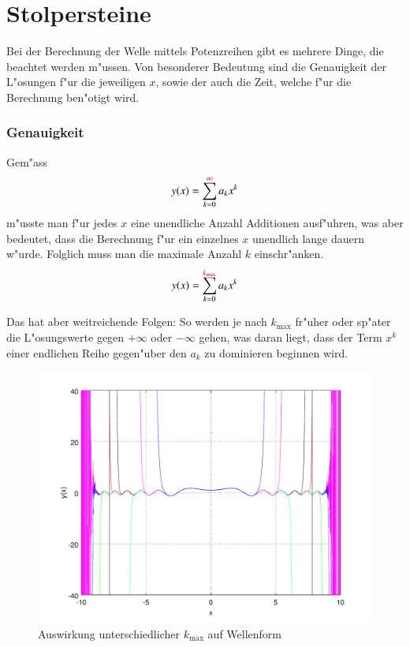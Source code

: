 \section{Stolpersteine}

Bei der Berechnung der Welle mittels Potenzreihen gibt es mehrere Dinge, die 
beachtet werden m"ussen. Von besonderer Bedeutung sind die Genauigkeit der 
L"osungen f"ur die jeweiligen $x$, sowie der auch die Zeit, welche f"ur die 
Berechnung ben"otigt wird.

\subsubsection{Genauigkeit}
Gem"ass
\begin{equation*}
	y(x) = \sum_{k=0}^{\textcolor{red}{\infty}}a_kx^k
\end{equation*}
m"usste man f"ur jedes $x$ eine unendliche Anzahl Additionen ausf"uhren, was 
aber bedeutet, dass die Berechnung f"ur ein einzelnes $x$ unendlich lange 
dauern w"urde. Folglich muss man die maximale Anzahl $k$ einschr"anken.
\begin{equation*}
	y(x) = \sum_{k=0}^{\textcolor{red}{k_{\text{max}}}}a_kx^k
\end{equation*}

Das hat aber weitreichende Folgen: So werden je nach $k_{\text{max}}$ fr"uher 
oder sp"ater die L"osungswerte gegen $+\infty$ oder $-\infty$ gehen, was daran 
liegt, dass der Term $x^k$ einer endlichen Reihe gegen"uber den $a_k$ zu 
dominieren beginnen wird.

\begin{figure}
	\includegraphics[scale=0.65]{./wellen/images/kmax/kmax.pdf}
	\caption{Auswirkung unterschiedlicher $k_{\text{max}}$ auf Wellenform}
	\label{fig:wellen:variablekmax}
\end{figure}

